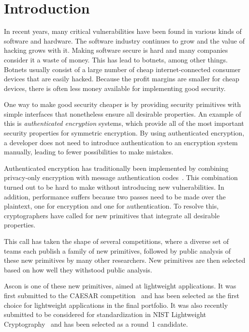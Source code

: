 \section{Introduction}

In recent years, many critical vulnerabilities have been found in various kinds
of software and hardware. The software industry continues to grow and the value
of hacking grows with it. Making software secure is hard and many companies
consider it a waste of money. This has lead to botnets, among other things.
Botnets usually consist of a large number of cheap internet-connected consumer
devices that are easily hacked. Because the profit margins are smaller for cheap
devices, there is often less money available for implementing good security.

One way to make good security cheaper is by providing security primitives with
simple interfaces that nonetheless ensure all desirable properties. An example
of this is \emph{authenticated encryption} systems, which provide all of the
most important security properties for symmetric encryption. By using
authenticated encryption, a developer does not need to introduce authentication
to an encryption system manually, leading to fewer possibilities to make
mistakes.

Authenticated encryption has traditionally been implemented by combining
privacy-only encryption with message authentication codes~\cite{aeadorder}. This
combination turned out to be hard to make without introducing new
vulnerabilities. In addition, performance suffers because two passes need to be
made over the plaintext, one for encryption and one for authentication. To
resolve this, cryptographers have called for new primitives that integrate all
desirable properties.

This call has taken the shape of several competitions, where a diverse set of
teams each publish a family of new primitives, followed by public analysis of
these new primitives by many other researchers. New primitives are then selected
based on how well they withstood public analysis.

Ascon is one of these new primitives, aimed at lightweight applications. It was
first submitted to the CAESAR competition~\cite{caesar} and has been selected as
the first choice for lightweight applications in the final portfolio. It was
also recently submitted to be considered for standardization in NIST Lightweight
Cryptography~\cite{nistlc} and has been selected as a round~1 candidate.

